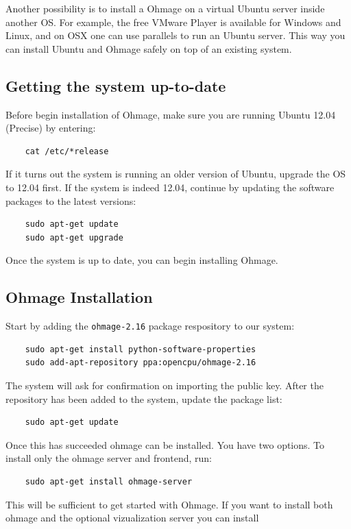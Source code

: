 \documentclass{scrartcl}
\begin{document}
\noindent Another possibility is to install a Ohmage on a virtual Ubuntu server
inside another OS. For example, the free VMware Player is available for Windows 
and Linux, and on OSX one can use parallels to run an Ubuntu server. This way
you can install Ubuntu and Ohmage safely on top of an existing system.

\subsection{Getting the system up-to-date}

\noindent Before begin installation of Ohmage, make sure you are running Ubuntu
12.04 (Precise) by entering:

\begin{verbatim}
    cat /etc/*release
\end{verbatim}
If it turns out the system is running an older version of Ubuntu, upgrade the OS
to 12.04 first. If the system is indeed 12.04, continue by updating the software
packages to the latest versions:

\begin{verbatim}
    sudo apt-get update
    sudo apt-get upgrade
\end{verbatim}
Once the system is up to date, you can begin installing Ohmage.

\subsection{Ohmage Installation}

Start by adding the \texttt{ohmage-2.16} package respository to our system:

\begin{verbatim}
    sudo apt-get install python-software-properties
    sudo add-apt-repository ppa:opencpu/ohmage-2.16
\end{verbatim}
The system will ask for confirmation on importing the public key. After the
repository has been added to the system, update the package list:

\begin{verbatim}
    sudo apt-get update
\end{verbatim}
Once this has succeeded ohmage can be installed. You have two options. To
install only the ohmage server and frontend, run:

\begin{verbatim}
    sudo apt-get install ohmage-server
\end{verbatim}
This will be sufficient to get started with Ohmage. If you want to install both
ohmage and the optional vizualization server you can install
\end{document}
